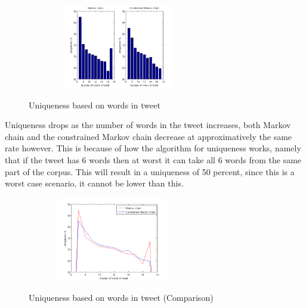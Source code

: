 \documentclass[a4paper,12pt]{article}
\begin{document}
\begin{figure}[h!]
  \hfill
  \begin{center}
  	{\includegraphics[width=300, height = 140]{UniqByNumWordsTweet.png}}
  \end{center}
  \caption{Uniqueness based on words in tweet}
 \end{figure}
 
 Uniqueness drops as the number of words in the tweet increases, both Markov chain and the constrained Markov chain decrease at  approximatively the same rate however. This is because of how the algorithm for uniqueness works, namely that if the tweet has 6 words then at worst it can take all 6 words from the same part of the corpus. This will result in a uniqueness of 50 percent, since this is a worst case scenario, it cannot be lower than this.
 
 \begin{figure}[h!]
   \hfill
   \begin{center}
  	{\includegraphics[width=280, height = 140]{UniqByNumWordsTweet2.png}}
  \end{center}
  \hfill
  \caption{Uniqueness based on words in tweet (Comparison)}
 \end{figure}
 
\end{document}
